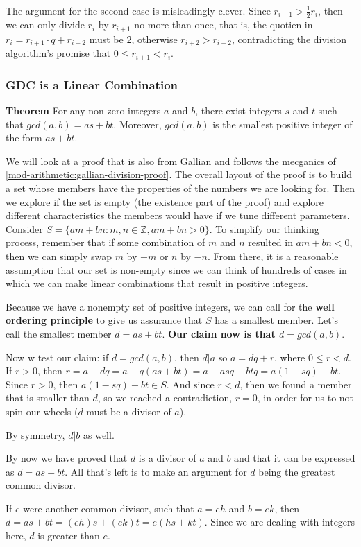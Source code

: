 The argument for the second case is misleadingly clever.
Since $r_{i+1} > \frac{1}{2}r_i$, then we can only divide $r_i$ by $r_{i+1}$ no more than once,
that is, the quotien in $r_i = r_{i+1}\cdot q + r_{i+2}$ must be 2, otherwise $r_{i+2} > r_{i+2}$,
contradicting the division algorithm's promise that $0 \leq r_{i+1} < r_i$.



\subsubsection{GDC is a Linear Combination}

\textbf{Theorem}
For any non-zero integers $a$ and $b$,
there exist integers $s$ and $t$ such that
$gcd(a,b) = as + bt$.
Moreover, $gcd(a,b)$ is the smallest positive integer of the form $as + bt$.

We will look at a proof that is also from Gallian and follows the mecganics of \ref{mod-arithmetic:gallian-division-proof}.
The overall layout of the proof is to build a set whose members have the properties of the numbers we are looking for.
Then we explore if the set is empty (the existence part of the proof) and explore different characteristics
the members would have if we tune different parameters.
\\

Consider $S = \{ am + bn : m,n\in\mathbb{Z}, am + bn > 0 \}$.
To simplify our thinking process, remember that if some combination of $m$ and $n$ resulted in $am + bn < 0$, then
we can simply swap $m$ by $-m$ or $n$ by $-n$.
From there, it is a reasonable assumption that our set is non-empty since we can think of hundreds of cases in which
we can make linear combinations that result in positive integers.

Because we have a nonempty set of positive integers, we can call for the \textbf{well ordering principle} to give us
assurance that $S$ has a smallest member.
Let's call the smallest member $d = as + bt$.
\textbf{Our claim now is that $d = gcd(a,b)$}.

Now w test our claim: if $d = gcd(a,b)$, then $d|a$ so $a = dq + r$, where $0 \leq r < d$.
If $r > 0$, then $r = a - dq = a - q(as + bt) = a - asq - btq = a(1 - sq) - bt$.
Since $r>0$, then $a(1 - sq) - bt \in S$.
And since $r < d$, then we found a member that is smaller than $d$, so we reached a contradiction, $r = 0$,
in order for us to not spin our wheels ($d$ must be a divisor of $a$).

By symmetry, $d|b$ as well.

By now we have proved that $d$ is a divisor of $a$ and $b$ and that it can be expressed as $d = as + bt$.
All that's left is to make an argument for $d$ being the greatest common divisor.

If $e$ were another common divisor, such that $a = eh$ and $b = ek$, then $d = as + bt = (eh)s + (ek)t = e(hs + kt)$.
Since we are dealing with integers here, $d$ is greater than $e$.